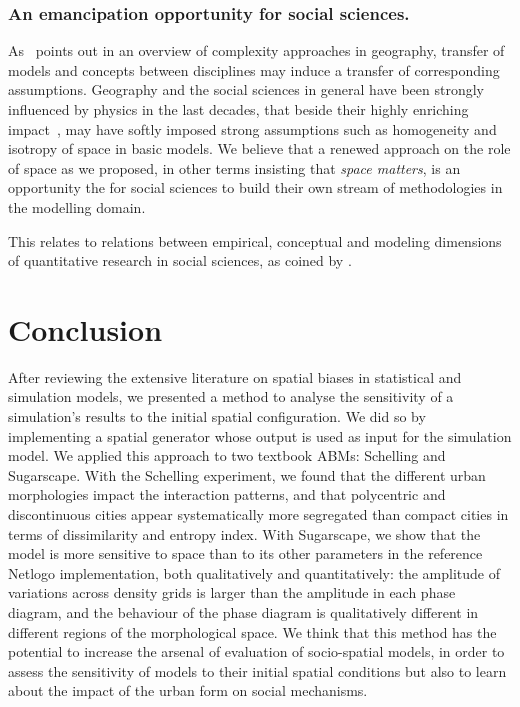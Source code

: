 \documentclass{JASSS}
\begin{document}
\subsubsection{An emancipation opportunity for social sciences.}


As~\citet{pumain2003approche} points out in an overview of complexity approaches in geography, transfer of models and concepts between disciplines may induce a transfer of corresponding assumptions. Geography and the social sciences in general have been strongly influenced by physics in the last decades, that beside their highly enriching impact~\citep{o2015physicists}, may have softly imposed strong assumptions such as homogeneity and isotropy of space in basic models. We believe that a renewed approach on the role of space as we proposed, in other terms insisting that \emph{space matters}, is an opportunity the for social sciences to build their own stream of methodologies in the modelling domain.

This relates to relations between empirical, conceptual and modeling dimensions of quantitative research in social sciences, as coined by \cite{livet2010ontology}. %



\section{Conclusion}

After reviewing the extensive literature on spatial biases in statistical and simulation models, we presented a method to analyse the sensitivity of a simulation's results to the initial spatial configuration. We did so by implementing a spatial generator whose output is used as input for the simulation model. We applied this approach to two textbook ABMs: Schelling and Sugarscape. With the Schelling experiment, we found that the different urban morphologies impact the interaction patterns, and that polycentric and discontinuous cities appear systematically more segregated than compact cities in terms of dissimilarity and entropy index. With Sugarscape, we show that the model is more sensitive to space than to its other parameters in the reference Netlogo implementation, both qualitatively and quantitatively: the amplitude of variations across density grids is larger than the amplitude in each phase diagram, and the behaviour of the phase diagram is qualitatively different in different regions of the morphological space. We think that this method has the potential to increase the arsenal of evaluation of socio-spatial models, in order to assess the sensitivity of models to their initial spatial conditions but also to learn about the impact of the urban form on social mechanisms.
\end{document}
